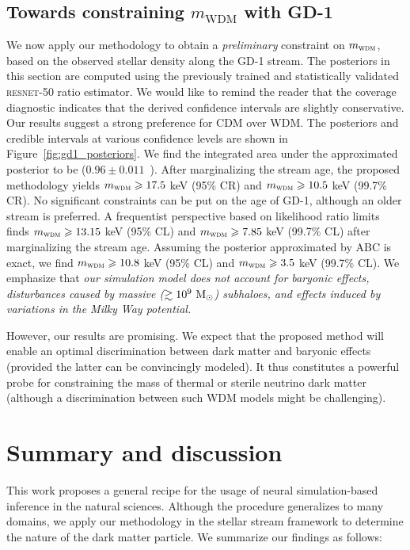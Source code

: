 \documentclass[fleqn,usenatbib]{mnras}
\begin{document}
\subsection{Towards constraining $m_\text{WDM}$ with GD-1}
\label{sec:experiments_gd1}
We now apply our methodology to obtain a \emph{preliminary} constraint on $m_\textsc{wdm}$,
based on the observed stellar density along the GD-1 stream.
The posteriors in this section are computed using the previously trained and statistically validated
\textsc{resnet}-50 ratio estimator. We would like to remind the reader that the coverage diagnostic indicates
that the derived confidence intervals are slightly conservative.
Our results suggest a strong preference for CDM over WDM.
The posteriors and credible intervals at various confidence levels are shown in Figure~\ref{fig:gd1_posteriors}. 
We find the integrated area under the approximated posterior to be ($0.96 \pm0.011$~\protect{}).
After marginalizing the stream age, the proposed methodology yields $m_\textsc{wdm}\geq 17.5$ keV (95\% CR) and $m_\textsc{wdm}\geq 10.5$ keV (99.7\% CR). 
No significant constraints can be put on the age of GD-1, although an older stream is preferred.
A frequentist perspective based on likelihood ratio limits finds
$m_\textsc{wdm}\geq 13.15$ keV (95\% CL) and $m_\textsc{wdm}\geq 7.85$ keV (99.7\% CL) after marginalizing the stream age. 
Assuming the posterior approximated by ABC is exact, we find 
$m_\textsc{wdm}\geq 10.8$ keV (95\% CL) and $m_\textsc{wdm}\geq 3.5$ keV (99.7\% CL).
We emphasize that \textit{our simulation model does not account for baryonic effects, disturbances caused by massive ($\gtrsim 10^9~\Msun$) subhaloes, and effects induced by variations in the Milky Way potential.}

\medskip

However, our results are promising.  We expect that the proposed method will enable an optimal discrimination between dark matter and baryonic effects (provided the latter can be convincingly modeled). It thus constitutes a powerful probe for constraining the mass of thermal or sterile neutrino dark matter~\citep{dodelson1994sterile,shi1999new,abazajian2001sterile,asaka2005numsm,boyarsky2009role} (although a discrimination between such WDM models might be challenging).

\section{Summary and discussion}
\label{sec:conclusion}
This work proposes a general recipe for the usage of
neural simulation-based inference in the natural sciences.
Although the procedure generalizes to many domains,
we apply our methodology in the stellar stream framework
to determine the nature of the dark matter particle.
We summarize our findings as follows:
\end{document}
